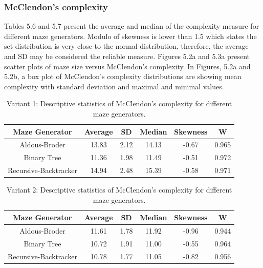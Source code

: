       \subsubsection{McClendon's complexity}
Tables 5.6 and 5.7 present the average and median of the complexity measure for different maze generators. Modulo of skewness is lower than 1.5 which states the set
distribution is very close to the normal distribution, therefore, the average and SD may be considered the reliable measure. Figures 5.2a and 5.3a present scatter
plots of maze size versus McClendon's complexity. In Figures, 5.2a and 5.2b, a box plot of McClendon's complexity distributions are showing
mean complexity with standard deviation and maximal and minimal values.\\
\begin{table}[!ht]
    \centering
    \caption{Variant 1: Descriptive statistics of McClendon's complexity for different maze generators.} 
    \begin{tabular}{c c c c c c}
    \hline
        Maze Generator & Average & SD & Median & Skewness & W  \\ \hline
        Aldous-Broder & 13.83 & 2.12 & 14.13 & -0.67 & 0.965  \\ 
        Binary Tree  & 11.36 & 1.98 & 11.49 & -0.51 & 0.972 \\ 
        Recursive-Backtracker  & 14.94 & 2.48 & 15.39 & -0.58 & 0.971 \\ \hline
    \end{tabular}
\end{table}  

\begin{table}[!ht]
    \centering
    \caption{Variant 2: Descriptive statistics of McClendon's complexity for different maze generators.} 
    \begin{tabular}{c c c c c c}
    \hline
        Maze Generator & Average & SD & Median & Skewness & W  \\ \hline
        Aldous-Broder & 11.61 & 1.78 & 11.92 & -0.96 & 0.944  \\ 
        Binary Tree & 10.72 & 1.91 & 11.00 & -0.55 & 0.964  \\ 
        Recursive-Backtracker & 10.78 & 1.77 & 11.05 & -0.82 & 0.956  \\ \hline
    \end{tabular}
\end{table}

